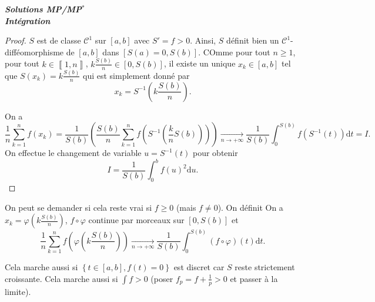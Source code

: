 \documentclass[12pt]{article}
\begin{document}
\begin{titlepage}
	\centering
	\vspace*{\fill}
	\Huge \textit{\textbf{Solutions MP/MP$^*$\\ Intégration}}
	\vspace*{\fill}
\end{titlepage}

\begin{proof}
    $S$ est de classe $\mathcal{C}^{1}$ sur $[a,b]$ avec $S'=f>0$. Ainsi, $S$ définit bien un $\mathcal{C}^{1}$-difféomorphisme de $[a,b]$ dans $[S(a)=0,S(b)]$. COmme pour tout $n\geqslant1$, pour tout $k\in\left\llbracket1,n\right\rrbracket$, $k\frac{S(b)}{n}\in[0,S(b)]$, il existe un unique $x_{k}\in[a,b]$ tel que $S(x_{k})=k\frac{S(b)}{n}$ qui est simplement donné par 
    \begin{equation*}
        \boxed{
            x_{k}=S^{-1}\left(k\frac{S(b)}{n}\right).
        }
    \end{equation*}

    On a 
    \begin{equation*}
        \frac{1}{n}\sum_{k=1}^{n}f(x_{k})=\frac{1}{S(b)}\left(\frac{S(b)}{n}\sum_{k=1}^{n}f\left(S^{-1}\left(\frac{k}{n}S(b)\right)\right)\right)\xrightarrow[n\to+\infty]{}\frac{1}{S(b)}\int_{0}^{S(b)}f\left(S^{-1}(t)\right)\mathrm{d}t=I.
    \end{equation*}
    On effectue le changement de variable $u=S^{-1}(t)$ pour obtenir
    \begin{equation*}
        \boxed{
            I=\frac{1}{S(b)}\int_{0}^{b}f(u)^{2}\mathrm{d}u.
        }
    \end{equation*}
\end{proof}

\begin{remark}
    On peut se demander si cela reste vrai si $f\geqslant0$ (mais $f\neq 0$). On définit 
    On a $x_{k}=\varphi\left(k\frac{S(b)}{n}\right)$, $f\circ \varphi$ continue par morceaux sur $[0,S(b)]$ et 
    \begin{equation*}
        \frac{1}{n}\sum_{k=1}^{n}f\left(\varphi\left(k\frac{S(b)}{n}\right)\right)\xrightarrow[n\to+\infty]{}\frac{1}{S(b)}\int_{0}^{S(b)}\left(f\circ \varphi\right)(t)\mathrm{d}t.
    \end{equation*}

    Cela marche aussi si $\left\lbrace t\in[a,b], f(t)=0\right\rbrace$ est discret car $S$ reste strictement croissante. Cela marche aussi si $\int f>0$ (poser $f_p=f+\frac{1}{p}>0$ et passer à la limite).
\end{remark}
\end{document}

